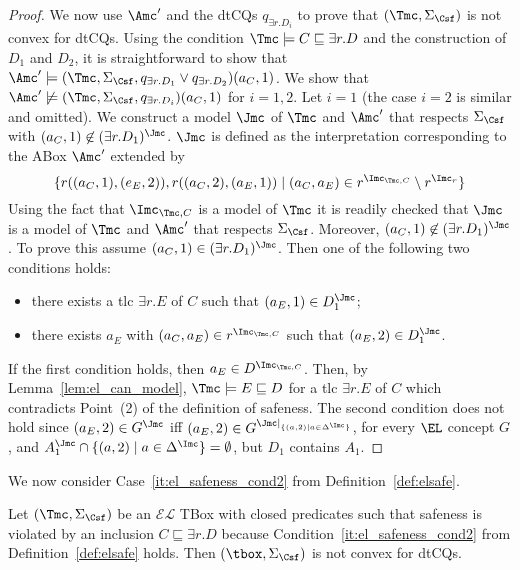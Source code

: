 \documentclass{lmcs}
\theoremstyle{definition}
\begin{document}
\begin{proof}
We now use $\Amc'$ and the dtCQs $q_{\exists r.D_{i}}$ to prove that $(\Tmc,\Sigma_{\Csf})$ is not convex for dtCQs.
Using the condition $\Tmc\models C \sqsubseteq \exists r.D$ and the construction of $D_{1}$ and $D_{2}$, 
it is straightforward to show that $\Amc'\models (\Tmc,\Sigma_\Csf,q_{\exists r.D_{1}}\vee q_{\exists r.D_{2}})(a_{C},1)$.
We show that $\Amc'\not\models (\Tmc,\Sigma_\Csf,q_{\exists r.D_{i}})(a_{C},1)$ for $i=1,2$.
Let $i=1$ (the case $i=2$ is similar and omitted). We construct a model $\Jmc$ of
$\Tmc$ and $\Amc'$ that respects $\Sigma_\Csf$ with $(a_{C},1)\not\in (\exists r.D_{1})^{\Jmc}$. 
$\Jmc$ is defined as the interpretation corresponding to the ABox $\Amc'$ extended by
  $$
  \{r((a_{C},1),(e_{E},2)),r((a_{C},2),(a_{E},1)) \mid (a_{C},a_{E})\in r^{\Imc_{\Tmc,C}}\setminus r^{\Imc_{r}}\} 
  $$
  Using the fact that $\Imc_{\Tmc,C}$ is a model of $\Tmc$ it is readily checked that
  $\Jmc$ is a model of $\Tmc$ and $\Amc'$ that respects $\Sigma_\Csf$.  Moreover,
  $(a_{C},1)\not\in (\exists r.D_{1})^{\Jmc}$. To prove this assume
  $(a_{C},1)\in (\exists r.D_{1})^{\Jmc}$.  Then one of the following
  two conditions holds:
  \begin{itemize}
  \item there exists a tlc $\exists r.E$ of $C$ such that
    $(a_{E},1)\in D_{1}^{\Jmc}$;
  \item there exists $a_{E}$ with $(a_{C},a_{E})\in r^{\Imc_{\Tmc,C}}$
    such that $(a_{E},2)\in D_{1}^{\Jmc}$.
  \end{itemize}
  If the first condition holds, then $a_{E}\in D^{\Imc_{\Tmc,C}}$. Then, by 
  Lemma~\ref{lem:el_can_model}, $\Tmc\models E \sqsubseteq D$ for
  a tlc $\exists r.E$ of $C$ which contradicts Point~(2) of the definition of safeness.
  The second condition does not
  hold since $(a_{E},2)\in G^{\Jmc}$ iff $(a_{E},2)\in G^{\Jmc|_{\{(a,2) \mid a\in \Delta^{\Imc}\}}}$,
  for every $\EL$ concept $G$, and $A_{1}^{\Jmc} \cap \{(a,2) \mid a\in \Delta^{\Imc}\}=\emptyset$,
  but $D_{1}$ contains $A_{1}$.
  \end{proof}
We now consider Case~\ref{it:el_safeness_cond2} from Definition~\ref{def:elsafe}.
\begin{lem}\label{lem:point1case2}
  Let $(\Tmc,\Sigma_\Csf)$ be an $\mathcal{EL}$ TBox with closed 
  predicates such that safeness is violated by an inclusion $C 
  \sqsubseteq \exists r.D$ because Condition~\ref{it:el_safeness_cond2} from Definition~\ref{def:elsafe}
  holds. Then $(\tbox,\Sigma_{\Csf})$ is not 
  convex for dtCQs.
\end{lem}
\end{document}
